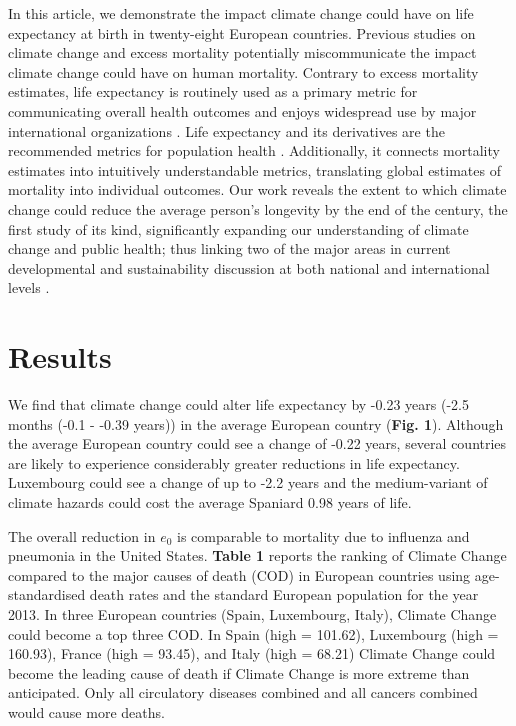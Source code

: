 \documentclass[12pt,]{article}
\begin{document}
In this article, we demonstrate the impact climate change could have on
life expectancy at birth in twenty-eight European countries. Previous
studies on climate change and excess mortality potentially
miscommunicate the impact climate change could have on human mortality.
Contrary to excess mortality estimates, life expectancy is routinely
used as a primary metric for communicating overall health outcomes and
enjoys widespread use by major international organizations
\citep{world2015world, marmot2012building, salomon2012healthy}. Life
expectancy and its derivatives are the recommended metrics for
population health \citep{parrish2010peer}. Additionally, it connects
mortality estimates into intuitively understandable metrics, translating
global estimates of mortality into individual outcomes. Our work reveals
the extent to which climate change could reduce the average person's
longevity by the end of the century, the first study of its kind,
significantly expanding our understanding of climate change and public
health; thus linking two of the major areas in current developmental and
sustainability discussion at both national and international levels
\citep{abel2016meeting}.

\section{Results}\label{results-1}

We find that climate change could alter life expectancy by -0.23 years
(-2.5 months (-0.1 - -0.39 years)) in the average European country
(\textbf{Fig. 1}). Although the average European country could see a
change of -0.22 years, several countries are likely to experience
considerably greater reductions in life expectancy. Luxembourg could see
a change of up to -2.2 years and the medium-variant of climate hazards
could cost the average Spaniard 0.98 years of life.

The overall reduction in \(e_0\) is comparable to mortality due to
influenza and pneumonia \citep{arias2013united} in the United States.
\textbf{Table 1} reports the ranking of Climate Change compared to the
major causes of death (COD) in European countries using age-standardised
death rates and the standard European population
\citep{pace2013revision} for the year 2013. In three European countries
(Spain, Luxembourg, Italy), Climate Change could become a top three COD.
In Spain (high = 101.62), Luxembourg (high = 160.93), France (high =
93.45), and Italy (high = 68.21) Climate Change could become the leading
cause of death if Climate Change is more extreme than anticipated. Only
all circulatory diseases combined and all cancers combined would cause
more deaths.
\end{document}
